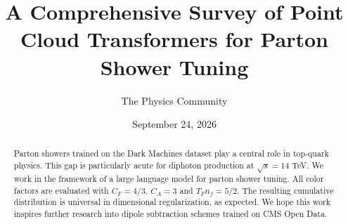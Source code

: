 \documentclass[11pt]{article}
\title{A Comprehensive Survey of Point Cloud Transformers for Parton Shower Tuning}
\author{The Physics Community}
\date{September 24, 2026}
\numberwithin{equation}{section}
\theoremstyle{definition}
\theoremstyle{remark}
\begin{document}
\maketitle
\begin{abstract}
Parton showers trained on the Dark Machines dataset play a central role
in top-quark physics. This gap is particularly acute for diphoton
production at $\sqrt{s} = 14$ TeV. We work in the framework of a large
language model for parton shower tuning. All color factors are evaluated
with $C_F = 4/3$, $C_A = 3$ and $T_F n_f = 5/2$. The resulting
cumulative distribution is universal in dimensional regularization, as
expected. We hope this work inspires further research into dipole
subtraction schemes trained on CMS Open Data.
\end{abstract}
\tableofcontents





\nocite{*}


\end{document}
